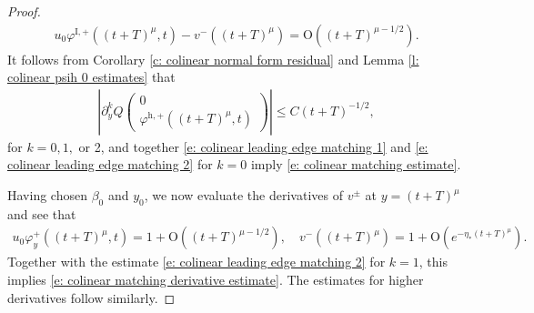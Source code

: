 \documentclass[11pt]{article}
\renewcommand{\phi}{\varphi}
\numberwithin{equation}{section}
\numberwithin{prop}{section}
\newcommand{\phihp}{\phi^\mathrm{h, +}}
\newcommand{\phiIp}{\phi^{\mathrm{I},+}}
\begin{document}
\begin{proof}
	\begin{align}
	u_0 \phiIp ((t+T)^\mu, t) - v^-((t+T)^\mu) = \mathrm{O} ((t+T)^{\mu-1/2}). \label{e: colinear leading edge matching 1}
	\end{align}
	It follows from Corollary \ref{c: colinear normal form residual} and Lemma \ref{l: colinear psih 0 estimates} that 
	\begin{align}
	\left| \partial_y^k Q \begin{pmatrix} 0 \\ \phihp ((t+T)^\mu, t) \end{pmatrix}  \right| \leq C
	(t+T)^{-1/2}, \label{e: colinear leading edge matching 2}
	\end{align}
	for $k = 0, 1,$ or 2, and together \eqref{e: colinear leading edge matching 1} and \eqref{e: colinear leading edge matching 2} for $k = 0$ imply \eqref{e: colinear matching estimate}. 
	
	Having chosen $\beta_0$ and $y_0$, we now evaluate the derivatives of $v^\pm$ at $y = (t+T)^\mu$ and see that 
	\begin{align*}
	u_0 \phi^+_y((t+T)^\mu, t) = 1 + \mathrm{O}((t+T)^{\mu-1/2}), \quad v^-((t+T)^\mu) = 1 + \mathrm{O}(e^{-\eta_* (t+T)^\mu}).
	\end{align*}
	Together with the estimate \eqref{e: colinear leading edge matching 2} for $k= 1$, this implies \eqref{e: colinear matching derivative estimate}. The estimates for higher derivatives follow similarly. 
\end{proof}
\end{document}
